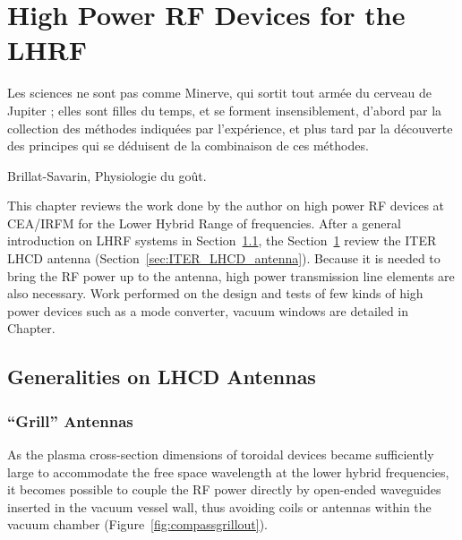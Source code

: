 \setchapterpreamble[u]{\margintoc}
\chapter[High Power RF Devices for the Lower Hybrid Range of Frequency]{High Power RF Devices for the LHRF}\label{eq:LHRF_work}

\setlength{\epigraphwidth}{.7\textwidth}
\epigraph{Les sciences ne sont pas comme Minerve, qui sortit tout armée du cerveau de Jupiter ; elles sont filles du temps, et se forment insensiblement, d’abord par la collection des méthodes indiquées par l’expérience, et plus tard par la découverte des principes qui se déduisent de la combinaison de ces méthodes. }{Brillat-Savarin, Physiologie du goût.}


This chapter reviews the work done by the author on high power RF devices at CEA/IRFM for the Lower Hybrid Range of frequencies. After a general introduction on LHRF systems in Section~\ref{sec:LHCD_antennas_general}, the Section~\ref{eq:LHRF_work} review the ITER LHCD antenna (Section~\ref{sec:ITER_LHCD_antenna}). Because it is needed to bring the RF power up to the antenna, high power transmission line elements are also necessary. Work performed on the design and tests of few kinds of high power devices such as a mode converter, vacuum windows are detailed in Chapter. 


\section[Generalities]{Generalities on LHCD Antennas}\label{sec:LHCD_antennas_general}

\subsection{“Grill” Antennas}
As the plasma cross-section dimensions of toroidal devices became sufficiently large to accommodate the free space wavelength at the lower hybrid frequencies, it becomes possible to couple the RF power directly by open-ended waveguides inserted in the vacuum vessel wall, thus avoiding coils or antennas within the vacuum chamber (Figure~\ref{fig:compassgrillout}).

